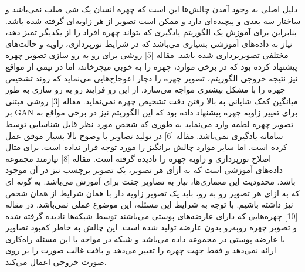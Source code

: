 دلیل اصلی به وجود آمدن چالش‌ها این است که چهره انسان یک شی صلب نمی‌باشد و ساختار سه بعدی و پیچیده‌ای دارد و ممکن است تصویر از هر زاویه‌ای گرفته شده باشد. بنابراین برای آموزش یک الگوریتم یادگیری که بتواند چهره افراد را از یکدیگر تمیز دهد، نیاز به داده‌های آموزشی بسیاری می‌باشد که در شرایط نورپردازی، زاویه و حالت‌های مختلفی تصویربرداری شده باشد.
مقاله [5] روشی برای رو به رو سازی تصویر چهره پیشنهاد کرده بود که در برخی موارد، چهره را به خوبی میچرخاند، اما در نیمی از مواقع نیز نتیجه خروجی الگوریتم، تصویر چهره را دچار اعوجاج‌هایی می‌نماید که روند تشخیص چهره را با مشکل بیشتری مواجه می‌سازد. از این رو فرایند رو به رو سازی به طور میانگین کمک شایانی به بالا رفتن دقت تشخیص چهره نمی‌نماید.
مقاله [3] روشی مبتنی بر GAN برای تغییر زاویه چهره پیشنهاد داده بود که این الگوریتم نیز در برخی مواقع به تصویر چهره لطمه وارد می‌نماید به طوری که شخص مورد نظر قابل شناسایی توسط سامانه یادگیری نمی‌باشد.
مقاله [6] در تولید تصاویر با وضوح بالا بسیار موفق عمل کرده است. اما سایر موارد چالش برانگیز را مورد توجه قرار نداده است. برای مثال اصلاح نورپردازی و زاویه چهره را نادیده گرفته است.
مقاله [8] نیازمند مجموعه داده‌های آموزشی است که به ازای هر تصویر، یک تصویر برچسب نیز در آن موجود باشد. محدودیت این معماری‌ها، نیاز به تصاویر جفت برای آموزش می‌باشد. به گونه ای که به ازای هر تصویر رو به رو، باید یک تصویر زاویه دار با همان شرایط از همان شخص نیز داشته باشیم. با توجه به شرایط این مسئله، این موضوع عملی نمی‌باشد.
در مقاله [10] چهره‌هایی که دارای عارضه‌های پوستی می‌باشند توسط شبکه‌ها نادیده گرفته شده و تصویر چهره روبه‌رو بدون عارضه تولید شده است. این چالش به خاطر کمبود تصاویر با عارضه پوستی در مجموعه داده می‌باشد و شبکه در مواجه با این مسئله راه‌کاری ارائه نمی‌دهد و فقط جهت چهره را تغییر می‌دهد و بافت غالب صورت را بر روی صورت خروجی اعمال می‌کند.
